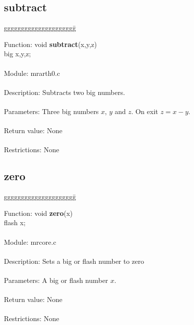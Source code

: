 \pagebreak

\subsection{subtract}

\begin{tabbing}
ggggggggggggggggggggg\= \kill

      Function:      \>void {\bf subtract}(x,y,z) \\
                     \>big x,y,z; \\
      \ \\
      Module:        \>mrarth0.c \\
      \ \\
      Description:   \>Subtracts two big numbers. \\
      \ \\
      Parameters:    \>Three big numbers $x$, $y$ and $z$. On exit $z=x-y$. \\
      \ \\
      Return value:  \>None \\
      \ \\
      Restrictions:  \>None
\end{tabbing}



\subsection{zero}

\begin{tabbing}
ggggggggggggggggggggg\= \kill

      Function:      \>void {\bf zero}(x) \\
                     \>flash x; \\
      \ \\
      Module:        \>mrcore.c \\
      \ \\
      Description:   \>Sets a big or flash number to zero    \\
      \ \\
      Parameters:    \>A big or flash number $x$. \\
      \ \\
      Return value:  \>None \\
      \ \\
      Restrictions:  \>None \\

\end{tabbing}
\pagebreak
